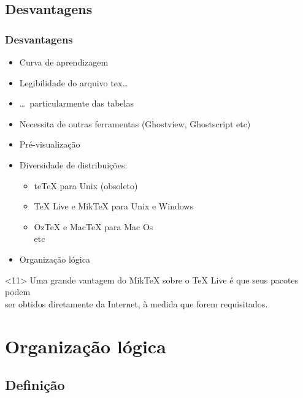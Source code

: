 \documentclass[handout]{beamer}
\begin{document}
\subsection{Desvantagens}
\begin{frame}
	\frametitle{Desvantagens}

	\begin{itemize}
	\item<+-> Curva de aprendizagem
	\item<+-> Legibilidade do arquivo \textsf{tex}\dots
	\item<+-> \dots\ particularmente das tabelas
	\item<+-> Necessita de outras ferramentas (Ghostview, Ghostscript etc)
	\item<+-> Pré-visualização
	\item<+-> Diversidade de distribuições:
		\begin{itemize}
			\item<+-> \textsf{teTeX} para Unix (obsoleto)
			\item<+-> \textsf{TeX Live} e \alert<11>{\textsf{MikTeX}} para Unix e \alert<11>{Windows}
			\item<+-> \textsf{OzTeX} e \textsf{MacTeX} para Mac Os\\ etc
		\end{itemize}
	\item<+-> \alert<10>{Organização lógica}
	\end{itemize}
	
	\begin{center}
		\begin{uncoverenv}<11>
			\scriptsize
			Uma grande vantagem do MikTeX sobre o TeX Live é que seus pacotes podem\\
			ser obtidos	diretamente da Internet, à medida que forem requisitados.\par
		\end{uncoverenv}
	\end{center}
	
\end{frame}

\section{Organização lógica}
\subsection{Definição}
\end{document}
